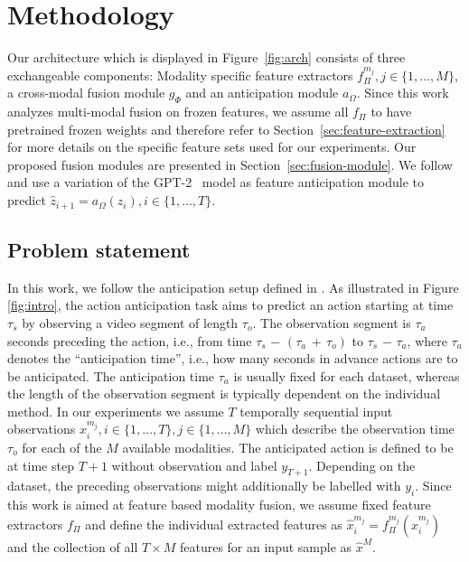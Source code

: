 \documentclass[10pt,twocolumn,letterpaper,dvipsnames]{article}
\begin{document}
 \section{Methodology}
Our architecture which is displayed in Figure~\ref{fig:arch} consists of three exchangeable components: Modality specific feature extractors $f_\Pi^{m_j}, j\in\{1,\dots,M\}$, a cross-modal fusion module $g_\Phi$ and an anticipation module $a_\Omega$. Since this work analyzes multi-modal fusion on frozen features, we assume all $f_{\Pi}$ to have pretrained frozen weights and therefore refer to Section~\ref{sec:feature-extraction} for more details on the specific feature sets used for our experiments. Our proposed fusion modules are presented in Section~\ref{sec:fusion-module}. We follow \cite{girdharAnticipativeVideoTransformer2021} and use a variation of the GPT-2~\cite{radford2019language} model as feature anticipation module to predict $\hat{z}_{i+1} = a_\Omega(z_i), i\in\{1,\dots,T\}$.

\subsection{Problem statement}
In this work, we follow the anticipation setup defined in \cite{damen2018scaling,damen2020epic}. As illustrated in Figure \ref{fig:intro}, the action anticipation task aims to predict an action starting at time $\tau_s$ by observing a video segment of length $\tau_o$. The observation segment is $\tau_a$ seconds preceding the action, i.e., from time $\tau_s$ $-$ $(\tau_a \, + \, \tau_o )$ to $\tau_s$ $-$ $\tau_a$,  where $\tau_a$ denotes the ``anticipation time'', i.e., how many seconds in advance actions are to be anticipated. The anticipation time $\tau_a$ is usually fixed for each dataset, whereas the length of the observation segment is typically dependent on the individual method. In our experiments we assume $T$ temporally sequential input  observations $x_i^{m_j}, i \in \{1,\dots,T\}, j \in \{1,\dots,M\}$ which describe the observation time $\tau_o$ for each of the $M$ available modalities. The anticipated action is defined to be at time step $T+1$ without observation and label $y_{T+1}$. Depending on the dataset, the preceding observations might additionally be labelled with $y_{i}$. Since this work is aimed at feature based modality fusion, we assume fixed feature extractors $f_\Pi$ and define the individual extracted features as $\hat{x}_i^{m_j} = f^{m_j}_\Pi(x_i^{m_j})$ and the collection of all $T\times M$ features for an input sample as $\hat{x}^M$. 
\end{document}

